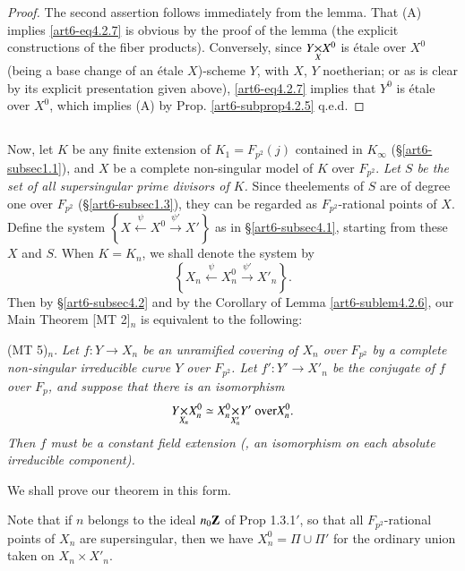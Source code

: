 \begin{proof}
The second assertion follows immediately from the lemma. That (A) implies \eqref{art6-eq4.2.7} is obvious by the proof of the lemma (the explicit constructions of the fiber products). Conversely, since $\fprod{Y}{X^0}{X}$ is \'etale over $X^0$ (being a base change of an \'etale $X$)-scheme $Y$, with $X$, $Y$ noetherian; or as is clear by its explicit presentation given above), \eqref{art6-eq4.2.7} implies that $Y^0$ is \'etale over $X^0$, which implies (A) by Prop. \ref{art6-subprop4.2.5} q.e.d.
\end{proof}

\subsection{}\label{art6-subsec4.3}
Now, let $K$ be any finite extension of $K_1 = F_{p^2} (j)$ contained in $K_\infty$ (\S \ref{art6-subsec1.1}), and $X$ be a complete non-singular model of $K$ over $F_{p^2}$. \textit{Let $S$ be the set of all supersingular prime divisors of $K$.} Since the\pageoriginale elements of $S$ are of degree one over $F_{p^2}$ (\S \eqref{art6-subsec1.3}), they can be regarded as $F_{p^2}$-rational points of $X$. Define the system $\left\{X \xleftarrow{\psi} X^0 \xrightarrow{\psi'} X' \right\}$ as in \S \eqref{art6-subsec4.1}, starting from these $X$ and $S$. When $K= K_n$, we shall denote the system by
\setcounter{equation}{0}
\begin{equation}
\left\{X_n \xleftarrow{\psi} X^0_n \xrightarrow{\psi'} X'_n \right\}.
\label{art6-eq4.3.1}
\end{equation}
Then by \S \ref{art6-subsec4.2} and by the Corollary of Lemma \ref{art6-sublem4.2.6}, our Main Theorem [MT 2]$_n$ is equivalent to the following:

(MT 5)$_n$. \textit{Let $f: Y \to X_n$ be an unramified covering of $X_n$ over $F_{p^2}$ by a complete non-singular irreducible curve $Y$ over $F_{p^2}$. Let $f' : Y' \to X'_n$ be the conjugate of $f$ over $F_p$, and suppose that there is an isomorphism}
\begin{equation}
\fprod{Y}{X^0_n}{X_n} \simeq \fprod{X^0_n}{Y'}{X'_n} \text{ over} X^0_n. \label{art6-eq4.3.2}
\end{equation}
\textit{Then $f$ must be a constant field extension (\ie, an isomorphism on each absolute irreducible component).}

We shall prove our theorem in this form.

Note that if $n$ belongs to the ideal $n_0 \mathbf{Z}$ of Prop 1.3.1$'$, so that all $F_{p^2}$-rational points of $X_n$ are supersingular, then we have $X^0_n = \Pi \cup \Pi'$ 
for the ordinary union taken on $X_n \times X'_n$.

